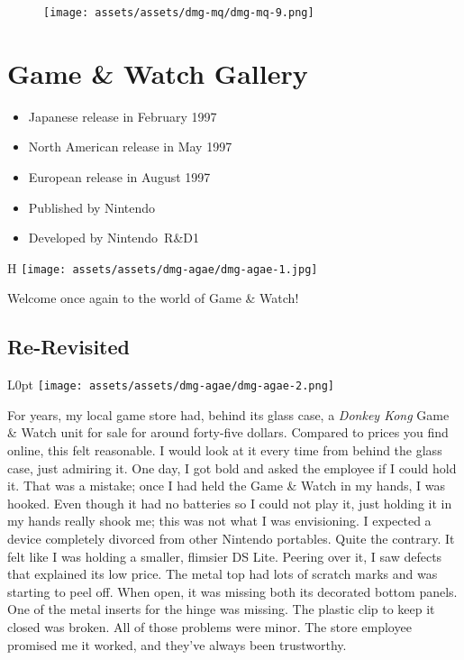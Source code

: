 \documentclass{book}
\begin{document}
\begin{figure}[hbt]
\vskip 10pt
\centering \texttt{[image: assets/assets/dmg-mq/dmg-mq-9.png]}
\vskip 6pt
\end{figure}


\begingroup \chapter*{Game \& Watch Gallery} \endgroup

\begin{itemize} \setlength\itemsep{-0.4em}
\item Japanese release in February 1997
\item North American release in May 1997
\item European release in August 1997
\item Published by Nintendo
\item Developed by Nintendo R\&D1
\end{itemize}\noindent

\begin{wrapfigure}{H}{\linewidth}
\vskip 4pt
\centering \texttt{[image: assets/assets/dmg-agae/dmg-agae-1.jpg]}\par\pagetwodescription Welcome once again to the world of Game \& Watch!\end{wrapfigure}
\clearpage

\FloatBarrier\needspace{10mm}\section*{Re-Revisited}\nopagebreak[4]

\begin{wrapfigure}{L}{0pt} \texttt{[image: assets/assets/dmg-agae/dmg-agae-2.png]}\end{wrapfigure}
For years, my local game store had, behind its glass case, a \emph{Donkey Kong} Game \& Watch unit for sale for around forty-five dollars. Compared to prices you find online, this felt reasonable. I would look at it every time from behind the glass case, just admiring it. One day, I got bold and asked the employee if I could hold it. That was a mistake; once I had held the Game \& Watch in my hands, I was hooked. Even though it had no batteries so I could not play it, just holding it in my hands really shook me; this was not what I was envisioning. I expected a device completely divorced from other Nintendo portables. Quite the contrary. It felt like I was holding a smaller, flimsier DS Lite. Peering over it, I saw defects that explained its low price. The metal top had lots of scratch marks and was starting to peel off. When open, it was missing both its decorated bottom panels. One of the metal inserts for the hinge was missing. The plastic clip to keep it closed was broken. All of those problems were minor. The store employee promised me it worked, and they’ve always been trustworthy.
\end{document}
